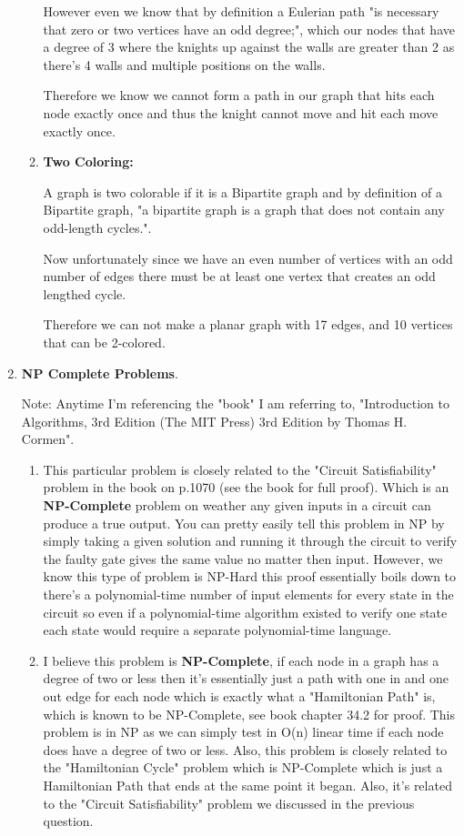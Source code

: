 \documentclass{article}
\begin{document}
\begin{enumerate}
\begin{enumerate}
        However even we know that by definition a Eulerian path "is necessary that zero or two vertices have an odd degree;", which our nodes that have a degree of 3 where the knights up against the walls are greater than 2 as there's 4 walls and multiple positions on the walls.
       
        Therefore we know we cannot form a path in our graph that hits each node exactly once and thus the knight cannot move and hit each move exactly once.

        \item \textbf{Two Coloring:}
        
        A graph is two colorable if it is a Bipartite graph and by definition of a Bipartite graph, "a bipartite graph is a graph that does not contain any odd-length cycles.". 

        Now unfortunately since we have an even number of vertices with an odd number of edges there must be at least one vertex that creates an odd lengthed cycle. 
       
        Therefore we can not make a planar graph with 17 edges, and 10 vertices that can be 2-colored.
    \end{enumerate}

    \item \textbf{NP Complete Problems}.
    
    Note: Anytime I'm referencing the "book" I am referring to, "Introduction to Algorithms, 3rd Edition (The MIT Press) 3rd Edition by Thomas H. Cormen".
 
    \begin{enumerate}
      \item This particular problem is closely related to the "Circuit Satisfiability" problem in the book on p.1070 (see the book for full proof). Which is an \textbf{NP-Complete} problem on weather any given inputs in a circuit can produce a true output.
      You can pretty easily tell this problem in NP by simply taking a given solution and running it through the circuit to verify the faulty gate gives the same value no matter then input. 
      However, we know this type of problem is NP-Hard this proof essentially boils down to there's a polynomial-time number of input elements for every state in the circuit so even if a polynomial-time algorithm existed to verify one state each state would require a separate polynomial-time language. 
      
      \item I believe this problem is \textbf{NP-Complete}, if each node in a graph has a degree of two or less then it's essentially just a path with one in and one out edge for each node which is exactly what a "Hamiltonian Path" is, which is known to be NP-Complete, see book chapter 34.2 for proof.
      This problem is in NP as we can simply test in O(n) linear time if each node does have a degree of two or less. Also, this problem is closely related to the "Hamiltonian Cycle" problem which is NP-Complete which is just a Hamiltonian Path that ends at the same point it began. 
      Also, it's related to the "Circuit Satisfiability" problem we discussed in the previous question.
    

\end{enumerate}
\end{enumerate}
\end{document}
